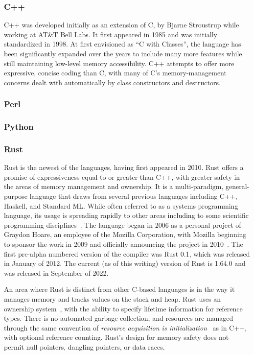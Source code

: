 \subsubsection{C++}

C++ was developed initially as an extension of C, by Bjarne Stroustrup while working at AT\&T Bell Labs. It first appeared in 1985 and was initially standardized in 1998. At first envisioned as ``C with Classes'', the language has been significantly expanded over the years to include many more features while still maintaining low-level memory accessibility. C++ attempts to offer more expressive, concise coding than C, with many of C's memory-management concerns dealt with automatically by class constructors and destructors.

\subsubsection{Perl}

\subsubsection{Python}

\subsubsection{Rust}

Rust is the newest of the languages, having first appeared in 2010. Rust offers a promise of expressiveness equal to or greater than C++, with greater safety in the areas of memory management and ownership. It is a multi-paradigm, general-purpose language that draws from several previous languages including C++, Haskell, and Standard ML. While often referred to as a systems programming language, its usage is spreading rapidly to other areas including to some scientific programming disciplines~\cite{nature.rust.2020}. The language began in 2006 as a personal project of Graydon Hoare, an employee of the Mozilla Corporation, with Mozilla beginning to sponsor the work in 2009 and officially announcing the project in 2010~\cite{asay.2021}. The first pre-alpha numbered version of the compiler was Rust 0.1, which was released in January of 2012. The current (as of this writing) version of Rust is 1.64.0 and was released in September of 2022.

An area where Rust is distinct from other C-based languages is in the way it manages memory and tracks values on the stack and heap. Rust uses an ownership system~\cite[Chapter~4]{programming.rust.2021}, with the ability to specify lifetime information for reference types. There is no automated garbage collection, and resources are managed through the same convention of \textit{resource acquisition is initialization}~\cite{cpp.design.evolution.1994} as in C++, with optional reference counting. Rust's design for memory safety does not permit null pointers, dangling pointers, or data races.

